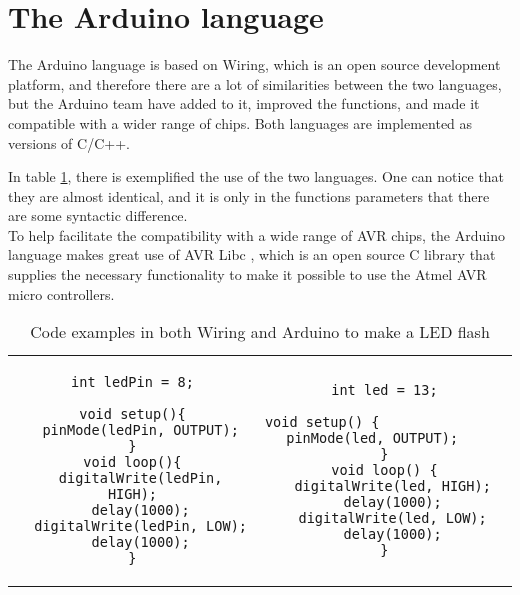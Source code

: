 \section{The Arduino language}
The Arduino language is based on Wiring, which is an open source development platform, and therefore there are a lot of similarities between the two languages, but the Arduino team have added to it, improved the functions, and made it compatible with a wider range of chips. Both languages are implemented as versions of C/C++.

In table \ref{tabel:comparison}, there is exemplified the use of the two languages. One can notice that they are almost identical, and it is only in the functions parameters that there are some syntactic difference.\\ 
To help facilitate the compatibility with a wide range of AVR chips, the Arduino language makes great use of AVR Libc \cite{AVR:lib}, which is an open source C library that supplies the necessary functionality to make it possible to use the Atmel AVR micro controllers.\\

\begin{table}[H]\scriptsize
\centering
\begin{tabular}{cc}
\begin{minipage}{7cm}
\begin{lstlisting}[caption=Wiring]
int ledPin = 8;

void setup(){
  pinMode(ledPin, OUTPUT);
}
void loop(){
  digitalWrite(ledPin, HIGH);
  delay(1000);
  digitalWrite(ledPin, LOW);
  delay(1000);
}
\end{lstlisting} 
\end{minipage}
 
& 
\begin{minipage}{7cm}
\begin{lstlisting}[caption=Arduino]
int led = 13;

void setup() {                
  pinMode(led, OUTPUT);     
}
void loop() {
  digitalWrite(led, HIGH);
  delay(1000);
  digitalWrite(led, LOW);
  delay(1000);
}
\end{lstlisting}
\end{minipage}
 
\end{tabular} 
\caption{Code examples in both Wiring and Arduino to make a LED flash}
\label{tabel:comparison}
\end{table}

